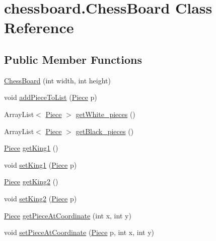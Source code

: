 \hypertarget{classchessboard_1_1_chess_board}{}\section{chessboard.\+Chess\+Board Class Reference}
\label{classchessboard_1_1_chess_board}
\subsection*{Public Member Functions}
\begin{DoxyCompactItemize}
\item 
\hyperlink{classchessboard_1_1_chess_board_a38aa6904871b6262948c855ade0eca00}{Chess\+Board} (int width, int height)
\item 
void \hyperlink{classchessboard_1_1_chess_board_a15c0c36e6095d524ac240559bcba55e0}{add\+Piece\+To\+List} (\hyperlink{classpiece_1_1_piece}{Piece} p)
\item 
Array\+List$<$ \hyperlink{classpiece_1_1_piece}{Piece} $>$ \hyperlink{classchessboard_1_1_chess_board_acc14cc7fad0cda996d1490fedb0188c5}{get\+White\+\_\+pieces} ()
\item 
Array\+List$<$ \hyperlink{classpiece_1_1_piece}{Piece} $>$ \hyperlink{classchessboard_1_1_chess_board_a8dc0208b60329e17af4e8f55200cfb50}{get\+Black\+\_\+pieces} ()
\item 
\hyperlink{classpiece_1_1_piece}{Piece} \hyperlink{classchessboard_1_1_chess_board_a4ef0d142d0b958c54b9ba5eadeffea87}{get\+King1} ()
\item 
void \hyperlink{classchessboard_1_1_chess_board_a22934b1f0864cca03bbbe47fbc788a60}{set\+King1} (\hyperlink{classpiece_1_1_piece}{Piece} p)
\item 
\hyperlink{classpiece_1_1_piece}{Piece} \hyperlink{classchessboard_1_1_chess_board_a23cacc50525158666322a65b4bf6bbcb}{get\+King2} ()
\item 
void \hyperlink{classchessboard_1_1_chess_board_a720f9ecb8d6aeb8795597b75ba19ac4b}{set\+King2} (\hyperlink{classpiece_1_1_piece}{Piece} p)
\item 
\hyperlink{classpiece_1_1_piece}{Piece} \hyperlink{classchessboard_1_1_chess_board_a468f723b34b4985741131377c093411a}{get\+Piece\+At\+Coordinate} (int x, int y)
\item 
void \hyperlink{classchessboard_1_1_chess_board_a6784a7de408948edcd83d0bccc5a5642}{set\+Piece\+At\+Coordinate} (\hyperlink{classpiece_1_1_piece}{Piece} p, int x, int y)
\item 

\end{DoxyCompactItemize}
